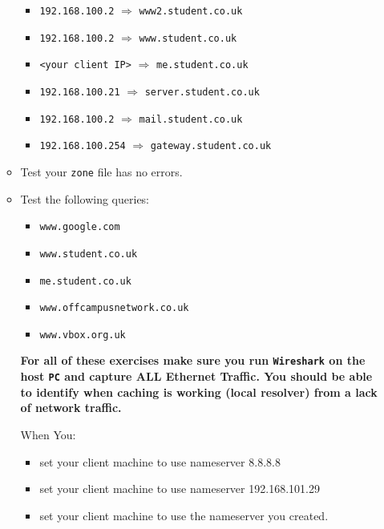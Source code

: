 \documentclass[11pt]{article}
\begin{document}
\begin{enumerate}
\begin{itemize}
                \begin{itemize}
                    \item \texttt{192.168.100.2} $\Rightarrow$ \texttt{www2.student.co.uk}
                    \item \texttt{192.168.100.2} $\Rightarrow$ \texttt{www.student.co.uk}
                    \item \texttt{<your client IP>} $\Rightarrow$ \texttt{me.student.co.uk}
                    \item \texttt{192.168.100.21} $\Rightarrow$ \texttt{server.student.co.uk}
                    \item \texttt{192.168.100.2} $\Rightarrow$ \texttt{mail.student.co.uk}
                    \item \texttt{192.168.100.254} $\Rightarrow$ \texttt{gateway.student.co.uk}
                \end{itemize}
            \item Test your \texttt{zone} file has no errors.
            \item Test the following queries:
                \begin{itemize}
                    \item \texttt{www.google.com}
                    \item \texttt{www.student.co.uk}
                    \item \texttt{me.student.co.uk}
                    \item \texttt{www.offcampusnetwork.co.uk}
                    \item \texttt{www.vbox.org.uk}
                \end{itemize}
                \begin{tcolorbox}[colback=blue!20]
                    \noindent\textbf{For all of these exercises make sure you run \texttt{Wireshark} on the host \texttt{PC} and capture ALL Ethernet Traffic. You should be able to identify when caching is working (local resolver) from a lack of network traffic.}
                \end{tcolorbox}
                When You:
                \begin{itemize}
                    \item set your client machine to use nameserver 8.8.8.8
                    \item set your client machine to use nameserver 192.168.101.29
                    \item set your client machine to use the nameserver you created.

\end{itemize}
\end{itemize}
\end{enumerate}
\end{document}

